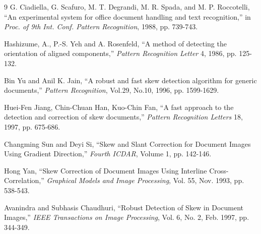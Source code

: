 \documentclass[conference]{IEEEtran}
\begin{document}
	\begin{thebibliography}{9}
		G. Ciadiella, G. Scafuro, M. T. Degrandi, M. R. Spada, and M. P. Roccotelli, ``An experimental system for office document handling and text recognition,'' in \textit{Proc. of 9th Int. Conf. Pattern Recognition}, 1988, pp. 739-743.
		
		Hashizume, A., P.-S. Yeh and A. Rosenfeld, ``A method of detecting the orientation of aligned components,'' \textit{Pattern Recognition Letter} 4, 1986, pp. 125-132.
		
		Bin Yu and Anil K. Jain, ``A robust and fast skew detection algorithm for generic documents,'' \textit{Pattern Recognition}, Vol.29, No.10, 1996, pp. 1599-1629.
		
		Huei-Fen Jiang, Chin-Chuan Han, Kuo-Chin Fan, ``A fast approach to the detection and correction of skew documents,'' \textit{Pattern Recognition Letters} 18, 1997, pp. 675-686.
		
		Changming Sun and Deyi Si, ``Skew and Slant Correction for Document Images Using Gradient Direction,'' \textit{Fourth ICDAR}, Volume 1, pp. 142-146.
		
		Hong Yan, ``Skew Correction of Document Images Using Interline Cross-Correlation,'' \textit{Graphical Models and Image Processing}, Vol. 55, Nov. 1993, pp. 538-543.
		
		Avanindra and Subhasis Chaudhuri, ``Robust Detection of Skew in Document Images,'' \textit{IEEE Transactions on Image Processing}, Vol. 6, No. 2, Feb. 1997, pp. 344-349.
	\end{thebibliography}
	
\end{document}
